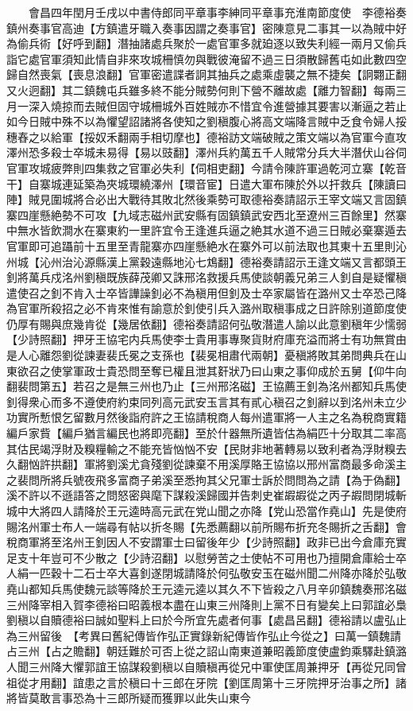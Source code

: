 　　會昌四年閏月壬戌以中書侍郎同平章事李紳同平章事充淮南節度使　李德裕奏鎮州奏事官高迪【方鎮遣牙職入奏事因謂之奏事官】密陳意見二事其一以為賊中好為偷兵術【好呼到翻】潛抽諸處兵聚於一處官軍多就廹逐以致失利經一兩月又偷兵詣它處官軍須知此情自非來攻城柵慎勿與戰彼淹留不過三日須散歸舊屯如此數四空歸自然喪氣【喪息浪翻】官軍密遣諜者詗其抽兵之處乘虛襲之無不捷矣【詗翾正翻又火迥翻】其二鎮魏屯兵雖多終不能分賊勢何則下營不離故處【離力智翻】每兩三月一深入燒掠而去賊但固守城柵城外百姓賊亦不惜宜令進營據其要害以漸逼之若止如今日賊中殊不以為懼望詔諸將各使知之劉稹腹心將高文端降言賊中乏食令婦人挼穗舂之以給軍【挼奴禾翻兩手相切摩也】德裕訪文端破賊之策文端以為官軍今直攻澤州恐多殺士卒城未易得【易以豉翻】澤州兵約萬五千人賊常分兵大半潛伏山谷伺官軍攻城疲弊則四集救之官軍必失利【伺相吏翻】今請令陳許軍過乾河立寨【乾音干】自寨城連延築為夾城環繞澤州【環音宦】日遣大軍布陳於外以扞救兵【陳讀曰陣】賊見圍城將合必出大戰待其敗北然後乘勢可取德裕奏請詔示王宰文端又言固鎮寨四崖懸絶勢不可攻【九域志磁州武安縣有固鎮鎮武安西北至遼州三百餘里】然寨中無水皆飲澗水在寨東約一里許宜令王逢進兵逼之絶其水道不過三日賊必棄寨遁去官軍即可追躡前十五里至青龍寨亦四崖懸絶水在寨外可以前法取也其東十五里則沁州城【沁州治沁源縣漢上黨穀遠縣地沁七鴆翻】德裕奏請詔示王逢文端又言都頭王釗將萬兵戍洺州劉稹既族薛茂卿又誅邢洺救援兵馬使談朝義兄弟三人釗自是疑懼稹遣使召之釗不肯入士卒皆譁譟釗必不為稹用但釗及士卒家屬皆在潞州又士卒恐己降為官軍所殺招之必不肯來惟有諭意於釗使引兵入潞州取稹事成之日許除别道節度使仍厚有賜與庶幾肯從【幾居依翻】德裕奏請詔何弘敬潛遣人諭以此意劉稹年少懦弱【少詩照翻】押牙王協宅内兵馬使李士貴用事專聚貨財府庫充溢而將士有功無賞由是人心離怨劉從諫妻裴氏冕之支孫也【裴冕相肅代兩朝】憂稹將敗其弟問典兵在山東欲召之使掌軍政士貴恐問至奪已權且泄其姧狀乃曰山東之事仰成於五舅【仰牛向翻裴問第五】若召之是無三州也乃止【三州邢洺磁】王協薦王釗為洺州都知兵馬使釗得衆心而多不遵使府約束同列高元武安玉言其有貳心稹召之釗辭以到洺州未立少功實所慙恨乞留數月然後詣府許之王協請稅商人每州遣軍將一人主之名為稅商實籍編戶家貲【編戶猶言編民也將即亮翻】至於什器無所遺皆估為絹匹十分取其二率高其估民竭浮財及糗糧輸之不能充皆忷忷不安【民財非地著轉易以致利者為浮財糗去久翻忷許拱翻】軍將劉溪尤貪殘劉從諫棄不用溪厚賂王協協以邢州富商最多命溪主之裴問所將兵號夜飛多富商子弟溪至悉拘其父兄軍士訴於問問為之請【為于偽翻】溪不許以不遜語答之問怒密與麾下謀殺溪歸國并告刺史崔嘏嘏從之丙子嘏問閉城斬城中大將四人請降於王元逵時高元武在党山聞之亦降【党山恐當作堯山】先是使府賜洺州軍士布人一端尋有帖以折冬賜【先悉薦翻以前所賜布折充冬賜折之舌翻】會稅商軍將至洺州王釗因人不安謂軍士曰留後年少【少詩照翻】政非已出今倉庫充實足支十年豈可不少散之【少詩沼翻】以慰勞苦之士使帖不可用也乃擅開倉庫給士卒人絹一匹穀十二石士卒大喜釗遂閉城請降於何弘敬安玉在磁州聞二州降亦降於弘敬堯山都知兵馬使魏元談等降於王元逵元逵以其久不下皆殺之八月辛卯鎮魏奏邢洺磁三州降宰相入賀李德裕曰昭義根本盡在山東三州降則上黨不日有變矣上曰郭誼必梟劉稹以自贖德裕曰誠如聖料上曰於今所宜先處者何事【處昌呂翻】德裕請以盧弘止為三州留後　【考異曰舊紀傳皆作弘正實錄新紀傳皆作弘止今從之】曰萬一鎮魏請占三州【占之贍翻】朝廷難於可否上從之詔山南東道兼昭義節度使盧鈞乘驛赴鎮潞人聞三州降大懼郭誼王協謀殺劉稹以自贖稹再從兄中軍使匡周兼押牙【再從兄同曾祖從才用翻】誼患之言於稹曰十三郎在牙院【劉匡周第十三牙院押牙治事之所】諸將皆莫敢言事恐為十三郎所疑而獲罪以此失山東今
